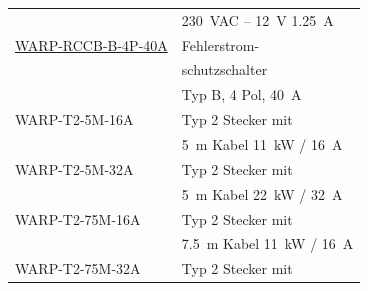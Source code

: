 \documentclass[a4paper,10pt]{article}
\begin{document}
\begin{multicols*}{2}
\begin{tabular}{ll}
		                                                                                                                         & \SI{230}{\volt}AC – \SI{12}{\volt} \SI{1,25}{\ampere}         \\
		\cmidrule(lr{0.5em}){1-2}
		\href{https://www.tinkerforge.com/de/shop/warp/rccb-type-b-4-pole-40a.html}{WARP-RCCB-B-4P-40A}                          & Fehlerstrom-                                                  \\
		                                                                                                                         & schutzschalter                                                \\
		                                                                                                                         & Typ B, 4 Pol, \SI{40}{\ampere}                                \\
		\cmidrule(lr{0.5em}){1-2}
		WARP-T2-5M-16A                                                                                                           & Typ 2 Stecker mit                                             \\
		                                                                                                                         & \SI{5}{\meter} Kabel \SI{11}{\kilo\watt} / \SI{16}{\ampere}   \\
		\cmidrule(lr{0.5em}){1-2}
		WARP-T2-5M-32A                                                                                                           & Typ 2 Stecker mit                                             \\
		                                                                                                                         & \SI{5}{\meter} Kabel \SI{22}{\kilo\watt} / \SI{32}{\ampere}   \\
		\cmidrule(lr{0.5em}){1-2}
		WARP-T2-75M-16A                                                                                                          & Typ 2 Stecker mit                                             \\
		                                                                                                                         & \SI{7,5}{\meter} Kabel \SI{11}{\kilo\watt} / \SI{16}{\ampere} \\
		\cmidrule(lr{0.5em}){1-2}
		WARP-T2-75M-32A                                                                                                          & Typ 2 Stecker mit                                             \\

\end{tabular}
\end{multicols*}
\end{document}
